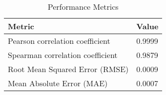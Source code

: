 \documentclass{article}
\begin{document}
\begin{table}[h!]
\centering
\begin{tabular}{ll}
\toprule
Metric & Value \\
\midrule
Pearson correlation coefficient & 0.9999 \\
Spearman correlation coefficient & 0.9879 \\
Root Mean Squared Error (RMSE) & 0.0009 \\
Mean Absolute Error (MAE) & 0.0007 \\
\bottomrule
\end{tabular}
\caption{Performance Metrics}
\label{tab:metrics}
\end{table}
\end{document}
